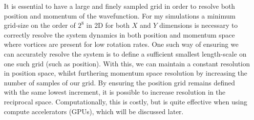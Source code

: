 It is essential to have a large and finely sampled grid in order to resolve both position and momentum of the wavefunction. For my simulations a minimum grid-size on the order of $2^8$ in 2D for both $X$ and $Y$ dimensions is necessary to correctly resolve the system dynamics in both position and momentum space where vortices are present for low rotation rates. One such way of ensuring we can accurately resolve the system is to define a sufficient smallest length-scale on one such grid (such as position). With this, we can maintain a constant resolution in position space, whilst furthering momentum space resolution by increasing the number of samples of our grid. By ensuring the position grid remains defined with the same lowest increment, it is possible to increase resolution in the reciprocal space. Computationally, this is costly, but is quite effective when using compute accelerators (GPUs), which will be discussed later. %
